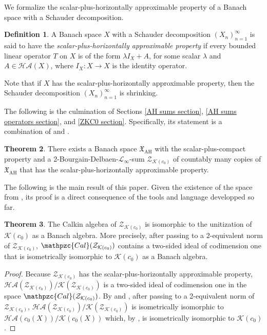 \documentclass[11pt]{amsart}
\theoremstyle{definition}
\newtheorem{theorem}{Theorem}[section]
\newtheorem{definition}[theorem]{Definition}
\numberwithin{equation}{section}
\begin{document}
We formalize the scalar-plus-horizontally approximable property of a Banach space with a Schauder decomposition.

\begin{definition}
A Banach space $X$ with a Schauder decomposition $(X_n)_{n=1}^\infty$ is said to have the {\em scalar-plus-horizontally approximable property} if every bounded linear operator $T$ on $X$ is of the form $\lambda I_X + A$, for some scalar $\lambda$ and $A\in\mathcal{HA}(X)$, where $I_X:X\to X$ is the identity operator.
\end{definition}

Note that if $X$ has the scalar-plus-horizontally approximable property, then the Schauder decomposition $(X_n)_{n=1}^\infty$ is shrinking.


The following is the culmination of Sections \ref{AH sums section}, \ref{AH sums operators section}, and \ref{ZKC0 section}. Specifically, its statement is a combination of  and .

\begin{theorem}
\label{AH sum of AH}
There exists a Banach space $\mathfrak{X}_\mathrm{AH}$ with the scalar-plus-compact property and a 2-Bourgain-Delbaen-$\mathscr{L}_\infty$-sum $\mathcal{Z}_{\mathcal{K}(c_0)}$ of countably many copies of $\mathfrak{X}_\mathrm{AH}$ that has the scalar-plus-horizontally approximable property.
\end{theorem}

The following is the main result of this paper. Given the existence of the space from , its proof is a direct consequence of the tools and language developped so far.

\begin{theorem}
The Calkin algebra of $\mathcal{Z}_{\mathcal{K}(c_0)}$ is isomorphic to the unitization of $\mathcal{K}(c_0)$ as a Banach algebra. More precisely, after passing to a $2$-equivalent norm of $\mathcal{Z}_{\mathcal{K}(c_0)}$, $\mathpzc{Cal}(\mathcal{Z}_{\mathcal{K}(c_0)})$ contains a two-sided ideal of codimension one that is isometrically isomorphic to $\mathcal{K}(c_0)$ as a Banach algebra.
\end{theorem}

\begin{proof}
Because $\mathcal{Z}_{\mathcal{K}(c_0)}$ has the scalar-plus-horizontally approximable property, $\mathcal{HA}(\mathcal{Z}_{\mathcal{K}(c_0)})/\mathcal{K}(\mathcal{Z}_{\mathcal{K}(c_0)})$ is a two-sided ideal of codimension one in the space $\mathpzc{Cal}(\mathcal{Z}_{\mathcal{K}(c_0)})$. By  and  , after passing to a 2-equivalent norm of $\mathcal{Z}_{\mathcal{K}(c_0)}$,  $\mathcal{HA}(\mathcal{Z}_{\mathcal{K}(c_0)})/\mathcal{K}(\mathcal{Z}_{\mathcal{K}(c_0)})$ is isometrically isomorphic to $\mathcal{HA}(c_0(X))/\mathcal{K}(c_0(X))$ which, by , is isometrically isomorphic to $\mathcal{K}(c_0)$.
\end{proof}
\end{document}
